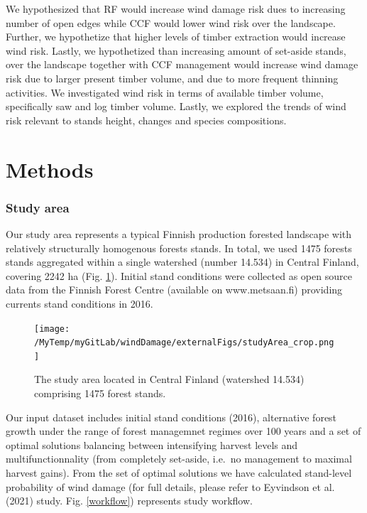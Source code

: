 \documentclass[]{elsarticle} %
\begin{document}
We hypothesized that RF would increase wind damage risk dues to
increasing number of open edges while CCF would lower wind risk over the
landscape. Further, we hypothetize that higher levels of timber
extraction would increase wind risk. Lastly, we hypothetized than
increasing amount of set-aside stands, over the landscape together with
CCF management would increase wind damage risk due to larger present
timber volume, and due to more frequent thinning activities. We
investigated wind risk in terms of available timber volume, specifically
saw and log timber volume. Lastly, we explored the trends of wind risk
relevant to stands height, changes and species compositions.

\section{Methods}\label{methods}

\subsubsection{Study area}\label{study-area}

Our study area represents a typical Finnish production forested
landscape with relatively structurally homogenous forests stands. In
total, we used 1475 forests stands aggregated within a single watershed
(number 14.534) in Central Finland, covering 2242 ha (Fig.
\ref{study_area}). Initial stand conditions were collected as open
source data from the Finnish Forest Centre (available on www.metsaan.fi)
providing currents stand conditions in 2016.

\begin{figure}
\centering
\texttt{[image: /MyTemp/myGitLab/windDamage/externalFigs/studyArea\_crop.png]}
\caption{The study area located in Central Finland (watershed 14.534)
comprising 1475 forest stands.\label{study_area}}
\end{figure}

Our input dataset includes initial stand conditions (2016), alternative
forest growth under the range of forest managemnet regimes over 100
years and a set of optimal solutions balancing between intensifying
harvest levels and multifunctionnality (from completely set-aside,
i.e.~no management to maximal harvest gains). From the set of optimal
solutions we have calculated stand-level probability of wind damage (for
full details, please refer to Eyvindson et al. (2021) study. Fig.
\ref{workflow}) represents study workflow.
\end{document}
